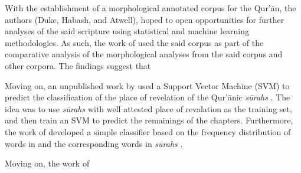 With the establishment of a morphological annotated corpus for the Qur'\=an, the authors (Duke, Habash, and Atwell), hoped to open opportunities for further analyses of the said scripture using statistical and machine learning methodologies. As such, the work of  used the said corpus as part of the comparative analysis of the morphological analyses from the said corpus and other corpora. The findings suggest that 


Moving on, an unpublished work by  used a Support Vector Machine (SVM) to predict the classification of the place of revelation of the Qur'\=anic \textit{s\=urahs} . The idea was to use \textit{s\=urahs}  with well attested place of revalation as the training set, and then train an SVM to predict the remainings of the chapters. Furthermore, the work of  developed a simple classifier based on the frequency distribution of words in   and the corresponding words in \textit{s\=urahs} .

Moving on, the work of 